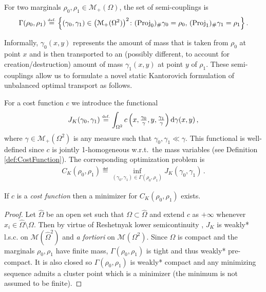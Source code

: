 \begin{definition}
For two marginals $\rho_0, \rho_1 \in \mathcal{M}_+(\Omega)$, the set of semi-couplings is
	\begin{align}
		\Gamma(\rho_0,\rho_1) \stackrel{\mbox{\upshape\tiny def.}}{=} \left\{
			(\gamma_0,\gamma_1) \in \big(\mathcal{M}_+(\Omega^2)\big)^2 \colon
			(\operatorname{Proj}_0)_{\#} \gamma_0 = \rho_0,\, (\operatorname{Proj}_1)_{\#} \gamma_1 = \rho_1
			\right\}.
	\end{align}
\end{definition}

Informally, $\gamma_0(x,y)$ represents the amount of mass that is taken from $\rho_0$ at point $x$ and is then transported to an (possibly different, to account for creation/destruction) amount of mass $\gamma_1(x,y)$ at point $y$ of $\rho_1$. These semi-couplings allow us to formulate a novel static Kantorovich formulation of unbalanced optimal transport as follows. 

\begin{definition}
	\label{def:extended kantorovich}
	For a cost function $c$ we introduce the functional
	\begin{align}
		J_K(\gamma_0,\gamma_1) \stackrel{\mbox{\upshape\tiny def.}}{=} \int_{\Omega^2} c \left( x,\textstyle{\frac{ \gamma_0}{ \gamma}},y,\textstyle{\frac{ \gamma_1}{ \gamma}}\right) \mathrm{d} \gamma(x,y)\, ,
	\end{align}
where $\gamma \in \mathcal{M}_+(\Omega^2)$ is any measure such that $\gamma_0, \gamma_1 \ll \gamma$. This functional is well-defined since $c$ is jointly 1-homogeneous w.r.t.\ the mass variables (see Definition \ref{def:CostFunction}).
	The corresponding optimization problem is
	\begin{align}
	\label{eq: static problem}
		C_K(\rho_0,\rho_1)  \eqdef \inf_{(\gamma_0,\gamma_1) \in \Gamma(\rho_0,\rho_1)}
			J_K(\gamma_0,\gamma_1)\,.
	\end{align}
\end{definition}


\begin{proposition}
	\label{prop:KMinimizers}
	If $c$ is a \emph{cost function} then a minimizer for $C_K(\rho_0,\rho_1)$ exists.
\end{proposition}
\begin{proof}
Let $\hat{\Omega}$ be an open set such that $\Omega \subset \hat{\Omega}$ and extend $c$ as $+\infty$ whenever $x_i \in \hat{\Omega}\setminus \Omega$. Then by virtue of Reshetnyak lower semicontinuity \cite[Theorem 2.38]{ambrosio2000functions}, $J_K$ is weakly* l.s.c. on $\mathcal{M}(\hat{\Omega}^2)$ and \emph{a fortiori} on $\mathcal{M}(\Omega^2)$. Since $\Omega$ is compact and the marginals $\rho_0,\rho_1$ have finite mass, $\Gamma(\rho_0,\rho_1)$ is tight and thus weakly* pre-compact. It is also closed so $\Gamma(\rho_0,\rho_1)$ is weakly* compact and any minimizing sequence admits a cluster point which is a minimizer (the minimum is not assumed to be finite).
\end{proof}

